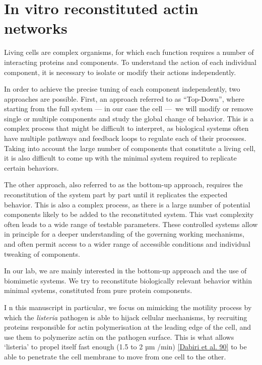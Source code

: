 \documentclass[A4paperpaper,11pt,english]{sphinxmanual}
\begin{document}
\section{In vitro reconstituted actin networks}
\label{parts/part1:in-vitro-reconstituted-actin-networks}
Living cells are complex organisms, for which each function requires a number
of interacting proteins and components. To understand the action of each
individual component, it is necessary to isolate or modify their actions
independently.

In order to achieve the precise tuning of each component independently, two
approaches are possible. First, an approach referred to  as ``Top-Down'', where
starting from the full system — in our case the cell — we will modify or remove
single or multiple components and study the global change of behavior. This is a complex
process that might be difficult to interpret, as biological systems often have
multiple pathways and feedback loops to regulate each of their processes. Taking into account the
large number of components that constitute a living cell, it is also
difficult to come up with the minimal system required to replicate certain behaviors.

The other approach, also referred to as the bottom-up approach, requires
the reconstitution of the system part by part until it replicates the expected
behavior. This is also a complex process, as there is a large number of potential components
likely to be added to the reconstituted system. This vast complexity
often leads to a wide range of testable parameters.
These controlled systems allow in principle for a deeper understanding of the governing
working mechanisms, and often permit access to a wider range of accessible
conditions and individual tweaking of components.

In our lab, we are mainly interested in the bottom-up approach and the use of
biomimetic systems. We try to reconstitute biologically relevant behavior within
minimal systems,  constituted from pure protein components.

I       n this manuscript in particular, we focus on mimicking the motility process
by which the \emph{listeria} pathogen is able to hijack cellular mechanisms, by recruiting proteins
responsible for actin polymerisation at the leading edge of the cell, and use
them to polymerize actin on the pathogen surface. This is what allows `listeria' to
propel itself fast enough (1.5 to 2 µm /min) {\hyperref[parts/part1:dabiri1990]{{[}Dabiri et al. 90{]}}} to be able to
penetrate the cell membrane to move from one cell to the other.
\end{document}
